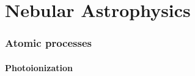 
\addtocounter{part}{2}

\part{Nebular Astrophysics}
\begin{frame}
  \partpage
  \tableofcontents[part=3]
\end{frame}

%
%

\section{Atomic processes}
\subsection{Photoionization}


